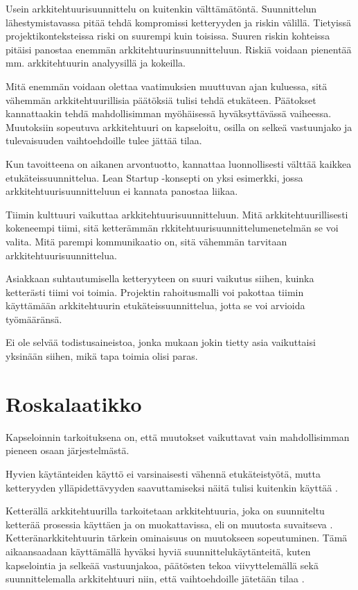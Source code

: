 Usein arkkitehtuurisuunnittelu on kuitenkin välttämätöntä. Suunnittelun lähestymistavassa pitää tehdä kompromissi ketteryyden ja riskin välillä. Tietyissä projektikonteksteissa riski on suurempi kuin toisissa. Suuren riskin kohteissa pitäisi panostaa enemmän arkkitehtuurinsuunnitteluun. Riskiä voidaan pienentää mm. arkkitehtuurin analyysillä ja kokeilla.

Mitä enemmän voidaan olettaa vaatimuksien muuttuvan ajan kuluessa, sitä vähemmän arkkitehtuurillisia päätöksiä tulisi tehdä etukäteen. Päätokset kannattaakin tehdä mahdollisimman myöhäisessä hyväksyttävässä vaiheessa. Muutoksiin sopeutuva arkkitehtuuri on kapseloitu, osilla on selkeä vastuunjako ja tulevaisuuden vaihtoehdoille tulee jättää tilaa.

Kun tavoitteena on aikanen arvontuotto, kannattaa luonnollisesti välttää kaikkea etukäteissuunnittelua. Lean Startup -konsepti on yksi esimerkki, jossa arkkitehtuurisuunnitteluun ei kannata panostaa liikaa.

Tiimin kulttuuri vaikuttaa arkkitehtuurisuunnitteluun. Mitä arkkitehtuurillisesti kokeneempi tiimi, sitä ketterämmän rkkitehtuurisuunnittelumenetelmän se voi valita. Mitä parempi kommunikaatio on, sitä vähemmän tarvitaan arkkitehtuurisuunnittelua.

Asiakkaan suhtautumisella ketteryyteen on suuri vaikutus siihen, kuinka ketterästi tiimi voi toimia. Projektin rahoitusmalli voi pakottaa tiimin käyttämään arkkitehtuurin etukäteissuunnittelua, jotta se voi arvioida työmääränsä.

Ei ole selvää todistusaineistoa, jonka mukaan jokin tietty asia vaikuttaisi yksinään siihen, mikä tapa toimia olisi paras.

\iffalse
\chapter{Roskalaatikko}

Kapseloinnin tarkoituksena on, että muutokset vaikuttavat vain mahdollisimman pieneen osaan järjestelmästä. 

Hyvien käytänteiden käyttö ei varsinaisesti vähennä etukäteistyötä, mutta ketteryyden ylläpidettävyyden saavuttamiseksi näitä tulisi kuitenkin käyttää \citep{waterman_agility_2018_a}. 

Ketterällä arkkitehtuurilla tarkoitetaan arkkitehtuuria, joka on suunniteltu ketterää prosessia käyttäen ja on muokattavissa, eli on muutosta suvaitseva \citep{waterman_how_2015}. Ketteränarkkitehtuurin tärkein ominaisuus on muutokseen sopeutuminen. Tämä aikaansaadaan käyttämällä hyväksi hyviä suunnittelukäytänteitä, kuten kapselointia ja selkeää vastuunjakoa, päätösten tekoa viivyttelemällä sekä suunnittelemalla arkkitehtuuri niin, että vaihtoehdoille jätetään tilaa \citep{waterman_agility_2018_a}. 

